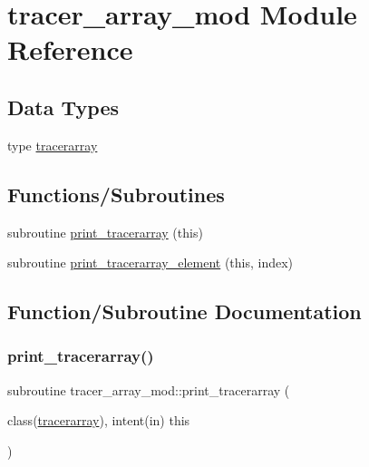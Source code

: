 \hypertarget{namespacetracer__array__mod}{}\section{tracer\+\_\+array\+\_\+mod Module Reference}
\label{namespacetracer__array__mod}
\subsection*{Data Types}
\begin{DoxyCompactItemize}
\item 
type \hyperlink{structtracer__array__mod_1_1tracerarray}{tracerarray}
\end{DoxyCompactItemize}
\subsection*{Functions/\+Subroutines}
\begin{DoxyCompactItemize}
\item 
subroutine \hyperlink{namespacetracer__array__mod_a173acbcf343367bf87b705fe5ca0dd29}{print\+\_\+tracerarray} (this)
\item 
subroutine \hyperlink{namespacetracer__array__mod_ac3b3896987e589190c759e92e95e05af}{print\+\_\+tracerarray\+\_\+element} (this, index)
\end{DoxyCompactItemize}


\subsection{Function/\+Subroutine Documentation}
\mbox{\label{namespacetracer__array__mod_a173acbcf343367bf87b705fe5ca0dd29}} 
\subsubsection{\texorpdfstring{print\+\_\+tracerarray()}{print\_tracerarray()}}
{\footnotesize\ttfamily subroutine tracer\+\_\+array\+\_\+mod\+::print\+\_\+tracerarray (\begin{DoxyParamCaption}\item[{class(\hyperlink{structtracer__array__mod_1_1tracerarray}{tracerarray}), intent(in)}]{this }\end{DoxyParamCaption})\hspace{0.3cm}{\ttfamily [private]}}

